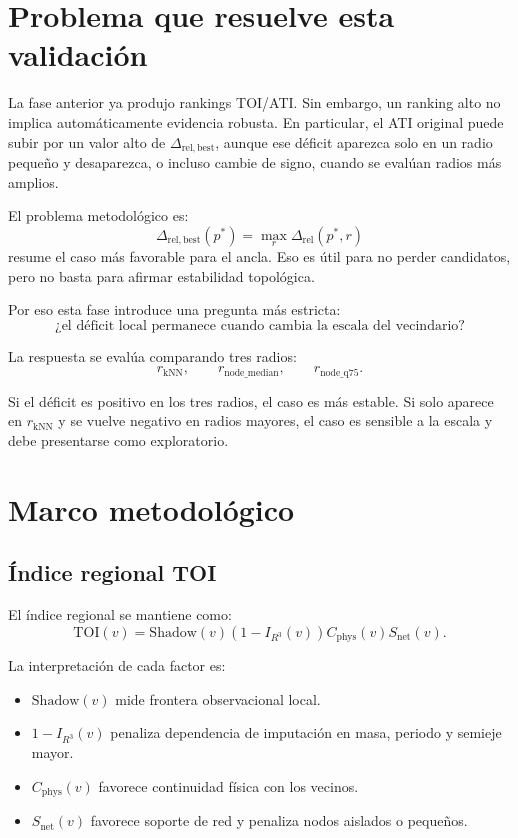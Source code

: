 \documentclass[11pt]{article}
\begin{document}
\section{Problema que resuelve esta validación}

La fase anterior ya produjo rankings TOI/ATI. Sin embargo, un ranking alto no implica automáticamente evidencia robusta. En particular, el ATI original puede subir por un valor alto de $\Delta_{\mathrm{rel,best}}$, aunque ese déficit aparezca solo en un radio pequeño y desaparezca, o incluso cambie de signo, cuando se evalúan radios más amplios.

El problema metodológico es:
\[
\Delta_{\mathrm{rel,best}}(p^*)=\max_r \Delta_{\mathrm{rel}}(p^*,r)
\]
resume el caso más favorable para el ancla. Eso es útil para no perder candidatos, pero no basta para afirmar estabilidad topológica.

Por eso esta fase introduce una pregunta más estricta:
\[
\text{¿el déficit local permanece cuando cambia la escala del vecindario?}
\]

La respuesta se evalúa comparando tres radios:
\[
r_{\mathrm{kNN}},\qquad r_{\mathrm{node\_median}},\qquad r_{\mathrm{node\_q75}}.
\]

Si el déficit es positivo en los tres radios, el caso es más estable. Si solo aparece en $r_{\mathrm{kNN}}$ y se vuelve negativo en radios mayores, el caso es sensible a la escala y debe presentarse como exploratorio.

\section{Marco metodológico}

\subsection{Índice regional TOI}

El índice regional se mantiene como:
\[
\mathrm{TOI}(v)=\mathrm{Shadow}(v)(1-I_{R^3}(v))C_{\mathrm{phys}}(v)S_{\mathrm{net}}(v).
\]

La interpretación de cada factor es:
\begin{itemize}
    \item $\mathrm{Shadow}(v)$ mide frontera observacional local.
    \item $1-I_{R^3}(v)$ penaliza dependencia de imputación en masa, periodo y semieje mayor.
    \item $C_{\mathrm{phys}}(v)$ favorece continuidad física con los vecinos.
    \item $S_{\mathrm{net}}(v)$ favorece soporte de red y penaliza nodos aislados o pequeños.
\end{itemize}
\end{document}
